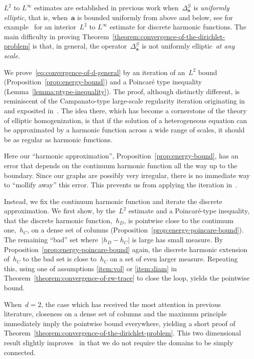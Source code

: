 \documentclass[12pt]{amsart}
\numberwithin{equation}{section}
\newcommand{\aDelta}{\hyperref[eq:geometric-laplacian]{{\Delta^{\mathcal{G}}_{\cond}}}}
\newcommand{\cond}{\hyperref[eq:geometric-laplacian]{\mathbf{a}}}
\begin{document}
$L^2$ to $L^\infty$ estimates are established in previous work when~$\aDelta$ is \emph{uniformly elliptic}, that is, when~$\cond$ is bounded uniformly from above and below, see for example~\cite[Proposition 5.3]{delmotte} for an interior~$L^2$ to $L^{\infty}$ estimate for discrete harmonic functions. The main difficulty in proving Theorem~\ref{theorem:convergence-of-the-dirichlet-problem} is that, in general, the operator~$\aDelta$ is not uniformly elliptic~\emph{at any scale}. 

We prove~\eqref{eq:convergence-of-d-general} by an iteration of an~$L^2$ bound (Proposition~\ref{prop:energy-bound}) and a Poincar\'e type inequality (Lemma~\ref{lemma:ptype-inequality}). The proof, although distinctly different, is reminiscent of the Campanato-type large-scale regularity iteration originating in~\cite{armstrongsmart} and exposited in~\cite[Chapter 4]{AKMBook}. The idea there, which has become a cornerstone of the theory of elliptic homogenization, is that if the solution 
of a heterogeneous equation can be approximated by a harmonic function across a wide range of scales, it should be as regular as harmonic functions.

Here our ``harmonic approximation'', Proposition~\ref{prop:energy-bound}, has an error 
that depends on the continuum harmonic function all the way up to the boundary. Since our graphs are possibly very irregular, there is no immediate way to ``mollify away'' this error. This prevents us from applying the iteration in~\cite{armstrongsmart}. 

Instead, we fix the continuum harmonic function and iterate the discrete approximation. We first show, by the~$L^2$ estimate and a Poincar\'e-type inequality, that the discrete harmonic function,~$h_D$, is pointwise close to the continuum one,~$h_C$, on a dense set of columns (Proposition~\ref{prop:energy-poincare-bound}). The remaining ``bad'' set where~$|h_D - h_C|$ is large has small measure. By Proposition~\ref{prop:energy-poincare-bound} again, the discrete harmonic extension of~$h_C$ to the bad set is close to~$h_C$ on a set of even larger measure. Repeating this, using one of assumptions \ref{item:vol} or \ref{item:diam} in Theorem~\ref{theorem:convergence-of-rw-trace} to close the loop, yields the pointwise bound. 

When~$d=2$, the case which has received the most attention in previous literature, closeness on a dense set of columns and the maximum principle immediately imply the pointwise bound everywhere, yielding a short proof of Theorem~\ref{theorem:convergence-of-the-dirichlet-problem}. This two dimensional result slightly improves~\cite[Theorem 1.1]{gurel2020dirichlet} in that we do not require the domains to be simply connected. 
\end{document}
